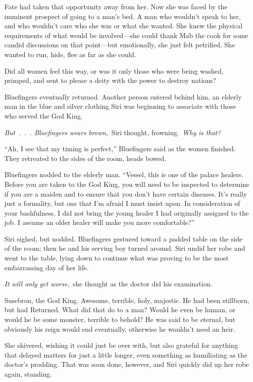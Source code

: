 Fate had taken that opportunity away from her. Now she was faced by the imminent prospect of going to a man’s bed. A man who wouldn’t speak to her, and who wouldn’t care who she was or what she wanted. She knew the physical requirements of what would be involved—she could thank Mab the cook for some candid discussions on that point—but emotionally, she just felt petrified. She wanted to run, hide, flee as far as she could.

Did all women feel this way, or was it only those who were being washed, primped, and sent to please a deity with the power to destroy nations?

Bluefingers eventually returned. Another person entered behind him, an elderly man in the blue and silver clothing Siri was beginning to associate with those who served the God King.

\textit{But~.~.~. Bluefingers wears brown,}~Siri thought, frowning.~\textit{Why is that?}

“Ah, I see that my timing is perfect,” Bluefingers said as the women finished. They retreated to the sides of the room, heads bowed.

Bluefingers nodded to the elderly man. “Vessel, this is one of the palace healers. Before you are taken to the God King, you will need to be inspected to determine if you are a maiden and to ensure that you don’t have certain diseases. It’s really just a formality, but one that I’m afraid I must insist upon. In consideration of your bashfulness, I did not bring the young healer I had originally assigned to the job. I assume an older healer will make you more comfortable?”

Siri sighed, but nodded. Bluefingers gestured toward a padded table on the side of the room; then he and his serving boy turned around. Siri undid her robe and went to the table, lying down to continue what was proving to be the most embarrassing day of her life.

\textit{It will only get worse,}~she thought as the doctor did his examination.

Susebron, the God King. Awesome, terrible, holy, majestic. He had been stillborn, but had Returned. What did that do to a man? Would he even be human, or would he be some monster, terrible to behold? He was said to be eternal, but obviously his reign would end eventually, otherwise he wouldn’t need an heir.

She shivered, wishing it could just be over with, but also grateful for anything that delayed matters for just a little longer, even something as humiliating as the doctor’s prodding. That was soon done, however, and Siri quickly did up her robe again, standing.

